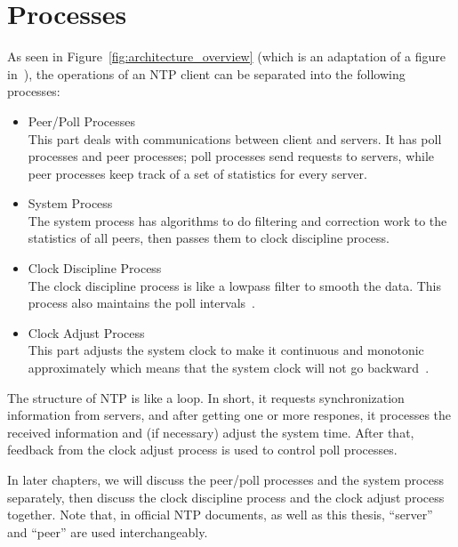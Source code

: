 \section{Processes}
\label{sec:processes}
As seen in Figure~\ref{fig:architecture_overview} (which is an adaptation
of a figure in~\cite{redbook}), the operations of an NTP client
can be separated into the following processes:
\begin{itemize}
    \item Peer/Poll Processes\\
        This part deals with communications between client and servers. It has
        poll processes and peer processes; poll processes send requests to
        servers, while peer processes keep track of a set of statistics for every
        server.
    \item System Process\\
        The system process has algorithms to do filtering and correction work
        to the statistics of all peers, then passes them to clock discipline
        process.
    \item Clock Discipline Process\\
        The clock discipline process is like a lowpass filter to smooth the
        data.  This process also maintains the poll intervals~\cite{redbook}.
    \item Clock Adjust Process\\
        This part adjusts the system clock to make it continuous and monotonic
        approximately which means that the system clock will not go
        backward~\cite{redbook}. 
\end{itemize}



The structure of NTP is like a loop. In short, it requests synchronization
information from servers, and after getting one or more respones, it processes
the received information and (if necessary) adjust the system time.  After
that, feedback from the clock adjust process is used to control poll processes.

In later chapters, we will discuss the peer/poll processes and the system
process separately, then discuss the clock discipline process and the clock
adjust process together. Note that, in official NTP documents, as well as this
thesis, ``server'' and ``peer'' are used interchangeably.


